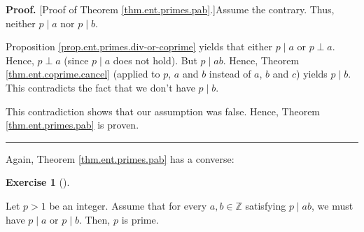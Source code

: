 \documentclass[numbers=enddot,12pt,final,onecolumn,notitlepage]{scrartcl}%
\newcounter{exer}
\numberwithin{exer}{subsection}
\theoremstyle{definition}
\newtheorem{exmp}[exer]{Exercise}
\newenvironment{exercise}[1][]
{\begin{exmp}[#1]\begin{leftbar}}
{\end{leftbar}\end{exmp}}
\newenvironment{proof}[1][Proof]{\noindent\textbf{#1.} }{\ \rule{0.5em}{0.5em}}
\begin{document}
\begin{proof}
[Proof of Theorem \ref{thm.ent.primes.pab}.]Assume the contrary. Thus, neither
$p\mid a$ nor $p\mid b$.

Proposition \ref{prop.ent.primes.div-or-coprime} yields that either $p\mid a$
or $p\perp a$. Hence, $p\perp a$ (since $p\mid a$ does not hold). But $p\mid
ab$. Hence, Theorem \ref{thm.ent.coprime.cancel} (applied to $p$, $a$ and $b$
instead of $a$, $b$ and $c$) yields $p\mid b$. This contradicts the fact that
we don't have $p\mid b$.

This contradiction shows that our assumption was false. Hence, Theorem
\ref{thm.ent.primes.pab} is proven.
\end{proof}

Again, Theorem \ref{thm.ent.primes.pab} has a converse:

\begin{exercise}
\label{exe.ent.primes.pab-conv}Let $p>1$ be an integer. Assume that for every
$a,b\in\mathbb{Z}$ satisfying $p\mid ab$, we must have $p\mid a$ or $p\mid b$.
Then, $p$ is prime.
\end{exercise}
\end{document}
